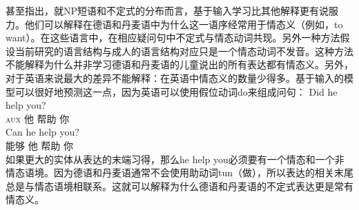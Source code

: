  \citet*{FPG2009a}甚至指出，就NP短语和不定式的分布而言，基于输入学习比其他解释更有说服力。他们可以解释在德语和丹麦语中为什么这一语序经常用于情态义（例如，to want）\citep{IT96a}。在这些语言中，在相应疑问句中不定式与情态动词共现。另外一种方法假设当前研究的语言结构与成人的语言结构对应只是一个情态动词不发音。这种方法不能解释为什么并非学习德语和丹麦语的儿童说出的所有表达都有情态义。另外，对于英语来说最大的差异不能解释：在英语中情态义的数量少得多。基于输入的模型可以很好地预测这一点，因为英语可以使用假位动词do来组成问句：
\eal
\ex 
\gll Did he help you?\\
     \textsc{aux} 他 帮助 你\\
\ex 
\gll Can he help you?\\
      能够 他 帮助 你\\
\zl
如果更大的实体从表达的末端习得，那么he help you必须要有一个情态和一个非情态语境。因为德语和丹麦语通常不会使用助动词tun（做），所以表达的相关末尾总是与情态语境相联系。这就可以解释为什么德语和丹麦语的不定式表达更是常有情态义。

